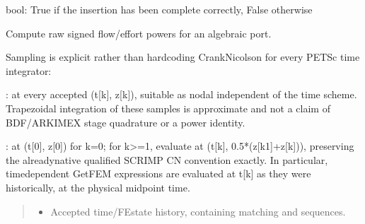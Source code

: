 \documentclass[letterpaper,10pt,english]{sphinxmanual}
\begin{document}
\begin{fulllineitems}
\begin{fulllineitems}
\begin{description}
\sphinxAtStartPar
bool: True if the insertion has been complete correctly, False otherwise

\end{description}

\end{fulllineitems}


\begin{fulllineitems}
\label{\detokenize{scrimp:scrimp.port.Port.compute}}
\pysigstartsignatures
\pysiglinewithargsret
{}
{\sphinxparamcomma {}\sphinxparamcomma {}\sphinxparamcomma {}\sphinxparamcomma {}}
{}
\pysigstopsignatures
\sphinxAtStartPar
Compute raw signed flow/effort powers for an algebraic port.

\sphinxAtStartPar
Sampling is explicit rather than hardcoding Crank\textendash{}Nicolson for
every PETSc time integrator:

\sphinxAtStartPar
{}: at every accepted (t{[}k{]}, z{[}k{]}), suitable as
nodal  independent of the time scheme. Trapezoidal
integration of these samples is approximate and not a claim
of BDF/ARKIMEX stage quadrature or a power identity.

\sphinxAtStartPar
{}: at (t{[}0{]}, z{[}0{]}) for k=0; for k\textgreater{}=1, evaluate
at (t{[}k{]}, 0.5*(z{[}k\sphinxhyphen{}1{]}+z{[}k{]})), preserving the already\sphinxhyphen{}native\sphinxhyphen{}
qualified SCRIMP CN convention exactly. In particular,
time\sphinxhyphen{}dependent GetFEM expressions are evaluated at t{[}k{]} as
they were historically,  at the physical midpoint time.
\begin{quote}\begin{description}
\begin{itemize}
\item {} 
\sphinxAtStartPar
{} \textendash{} Accepted time/FE\sphinxhyphen{}state history, containing
matching  and  sequences.


\end{itemize}
\end{description}
\end{quote}
\end{fulllineitems}
\end{fulllineitems}
\end{document}
